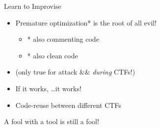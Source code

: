




\begin{frame}
  {Learn to Improvise}

  \begin{itemize}
    \item Premature optimization* is the root of all evil!
      \begin{itemize}
        \item * also commenting code
        \item * also clean code
      \end{itemize}
    \item (only true for attack \&\&  \emph{during} CTFs!)
    \item If it works, \ldots it works!
    \item Code-reuse between different CTFs
  \end{itemize}

\end{frame}

\begin{frame}
	\begin{center}
		\huge A fool with a tool is still a fool!
	\end{center}
\end{frame}

\begin{frame}
  {}
\end{frame}
